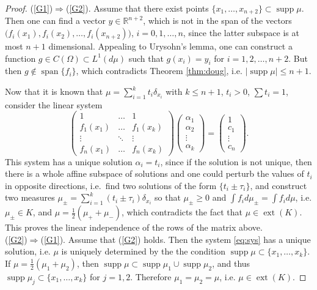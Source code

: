 \documentclass[11pt, leqno]{amsart}
\def\ext{\operatorname{ext}}
\def\sp{\operatorname{span}}
\def\supp{\operatorname{supp}}
\theoremstyle{definition}
\numberwithin{equation}{section}
\begin{document}
\begin{proof}
\noindent (\ref{G1})$\Rightarrow$(\ref{G2}).  Assume that there exist points $\{ x_1, \dots, x_{n+2} \} \subset \supp \mu$. Then one can find a vector $y \in \mathbb R^{n+2}$, which is not in the span of the vectors $\big(f_i (x_1),  f_i (x_2), \dots, f_i (x_{n+2}) \big)$, $i=0,1,\dots, n$, since the latter subspace is at most $n+1$ dimensional. Appealing to Urysohn's lemma, one can construct a  function $g \in C(\Omega) \subset L^1 (d\mu)$ such that $g (x_i ) = y_i$  for $i=1,2,\dots, n+2$.  But then $g\not\in \sp \{ f_i\}$, which contradicts Theorem \ref{thm:doug}, i.e. $\big| \supp \mu  \big| \le n+1$. 

Now that it is known that $\mu  = \sum_{i=1}^{k} t_i \delta_{x_i}$ with $k\le n+1$, $t_i > 0$, $\sum t_i =1$, consider the linear system 
\begin{equation}\label{eq:sys}
\begin{pmatrix} 1 & \dots & 1 \\
 f_1 (x_1) & \dots & f_1 (x_k) \\
 \vdots & \ddots & \vdots \\
f_n(x_1)  & \dots & f_n (x_k)  \end{pmatrix}
\begin{pmatrix} \alpha_1 \\ \alpha_2 \\ \vdots \\ \alpha_k    \end{pmatrix}  = 
\begin{pmatrix}  1 \\ c_1 \\ \vdots \\ c_n    \end{pmatrix}.
\end{equation} 
This system has a unique solution $\alpha_i = t_i$, since if the solution is not unique, then there is a whole affine subspace of solutions and one could perturb the values of $t_i$ in opposite directions, i.e.\ find two solutions of the form $\{ t_i \pm \tau_i \}$, and construct two measures $\mu_\pm =   \sum_{i=1}^{k} (t_i \pm \tau_i)  \delta_{x_i}$ so that $\mu_\pm \ge 0 $ and  $\int f_i d\mu_\pm = \int f_i d\mu$, 
i.e. $\mu_\pm \in K $, and  $\mu = \frac12 (\mu_+ + \mu_-) $, which contradicts the fact that $\mu \in \ext (K)$. This proves the linear independence of the rows of the matrix above. \\

\noindent (\ref{G2})$\Rightarrow$(\ref{G1}). Assume that (\ref{G2}) holds. Then the system \eqref{eq:sys} has a unique solution, i.e. $\mu$ is uniquely determined by the the condition $\supp \mu \subset \{x_1, \dots, x_k \}$. If $\mu = \frac12 (\mu_1 + \mu_2)$, then $\supp \mu \subset \supp \mu_1 \cup \supp \mu_2$, and thus $\supp \mu_j \subset \{x_1,\dots, x_k\}$ for $j=1,2$. Therefore $\mu_1=\mu_2 = \mu$, i.e. $\mu \in \ext (K)$.  
\end{proof}
\end{document}
